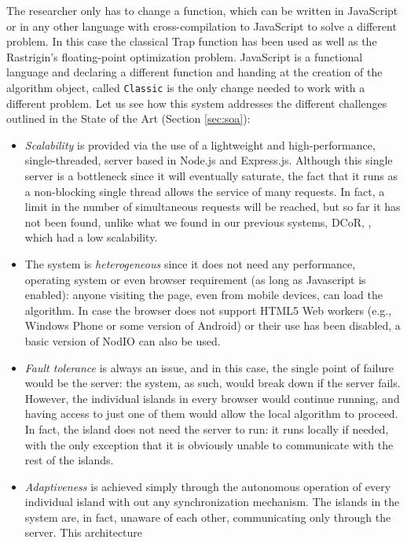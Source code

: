\documentclass[journal,onecolumn]{IEEEtran}
\begin{document}
The researcher only has to change a function, which can be written in
JavaScript or in any other language with cross-compilation to
JavaScript \cite{web:compilersjs} to solve a different
problem. In this case the classical Trap function \cite{Ackley1987} has been
used as well as the Rastrigin's floating-point optimization
problem. JavaScript is a functional language and declaring a different 
function and handing at the creation of the algorithm object, called
{\tt Classic} is the only change needed to work with a different
problem. Let us see how this system addresses the different challenges
outlined in the State of the Art (Section \ref{sec:soa}):
\begin{itemize}
\item {\em Scalability} is provided via the use of a lightweight and
  high-performance, single-threaded, server based in Node.js and
  Express.js. Although this single server is a bottleneck since it
  will eventually saturate, the fact that it runs as a non-blocking single thread
  allows the service of many requests. In fact, a limit in the
  number of simultaneous requests will be reached, but so far it has
  not been found, unlike what we found in our previous systems, DCoR,
  \cite{gecco07:workshop:dcor}, which had a low scalability. 
\item The system is {\em heterogeneous} since it does not need any
  performance, operating system or even browser requirement (as long
  as Javascript is enabled): anyone
  visiting the page, even from mobile devices, can load the algorithm.
  In case the browser does not support HTML5 Web workers (e.g., 
  Windows Phone or some version of Android) or their use
  has been disabled, a basic version of NodIO can also be used.
\item {\em Fault tolerance} is always an issue, and in this case, the
  single point of failure would be the server: the system, as such,
  would break down if the server fails. However, the individual
  islands in every browser would continue running, and having access
  to just one of them would allow the local algorithm to proceed. In
  fact, the island does not need the server to run: it runs locally if
  needed, with the only exception that it is obviously unable to
  communicate with the rest of the islands.
\item {\em Adaptiveness} is achieved simply through the autonomous
  operation of every individual island with out any synchronization
  mechanism. The islands in the system are, in fact, unaware of each
  other, communicating only through the server. This architecture 

\end{itemize}
\end{document}
